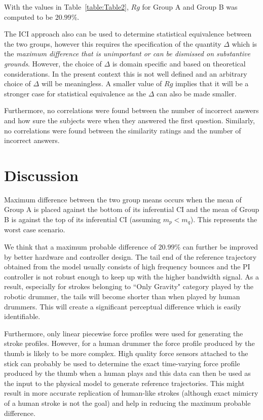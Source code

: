 \documentclass[final,1p,times]{elsarticle}
\begin{document}
With the values in Table~\ref{table:Table2}, $Rg$ for Group A and Group B was computed to be $20.99\%$. 

The ICI approach also can be used to determine statistical equivalence between the two groups, however this requires the specification of the quantity $\Delta$ which is the \textit{maximum difference that is unimportant or can be dismissed on substantive grounds}. However, the choice of $\Delta$ is domain specific and based on theoretical considerations. In the present context this is not well defined and an arbitrary choice of $\Delta$ will be meaningless. A smaller value of $Rg$ implies that it will be a stronger case for statistical equivalence as the $\Delta$ can also be made smaller. 

Furthermore, no correlations were found between
the number of incorrect answers and how sure the subjects were when they
answered the first question. Similarly, no correlations were found between
the similarity ratings and the number of incorrect answers. 
\section{Discussion}

Maximum difference between the two group means occurs when the mean of Group A is placed against the bottom of its inferential CI and the mean of Group B is against the top of its inferential CI (assuming $m_p < m_q$). This represents the worst case scenario. 

We think that  a maximum probable difference of $20.99\%$ can further be improved by better hardware and controller design.
 The tail end of the reference trajectory obtained from the model usually consists of high frequency bounces and the PI controller is not robust enough to keep up with the higher bandwidth signal. As a result, especially for strokes belonging to ``Only Gravity" category played by the robotic drummer, the tails will become shorter than when played by human drummers. This will create a significant perceptual difference which is easily identifiable. 

Furthermore, only linear piecewise force profiles were used for generating the stroke profiles. However, for a human drummer the force profile produced by the thumb is likely to be more complex. High quality force sensors attached to the stick can probably be used to determine the exact time-varying force profile produced by the thumb when a human plays and this data can then be used as the input to the physical model to generate reference trajectories. This might result in more accurate replication of human-like strokes (although exact mimicry of a human stroke is not the goal) and help in reducing the maximum probable difference. 
\end{document}
